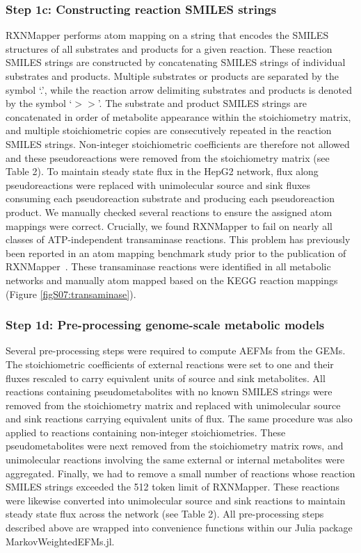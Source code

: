 \documentclass[12pt]{article}
\begin{document}
\subsubsection*{Step 1c: Constructing reaction SMILES strings}

RXNMapper performs atom mapping on a string that encodes the SMILES
structures of all substrates and products for a given reaction. These
reaction SMILES strings are constructed by concatenating SMILES strings of
individual substrates and products. Multiple substrates or products are
separated by the symbol `.', while the reaction arrow delimiting
substrates and products is denoted by the symbol `$>>$'. The substrate and
product SMILES strings are concatenated in order of metabolite appearance
within the stoichiometry matrix, and multiple stoichiometric copies are
consecutively repeated in the reaction SMILES strings. Non-integer
stoichiometric coefficients are therefore not allowed and these
pseudoreactions were removed from the stoichiometry matrix (see Table 2).
To maintain steady state flux in the HepG2 network, flux along
pseudoreactions were replaced with unimolecular source and sink fluxes
consuming each pseudoreaction substrate and producing each pseudoreaction
product. We manually checked several reactions to ensure the assigned atom
mappings were correct. Crucially, we found RXNMapper to fail on nearly all
classes of ATP-independent transaminase reactions. This problem has
previously been reported in an atom mapping benchmark study prior to the
publication of RXNMapper~\citep{PreciatGonzalezGermanA.2017Ceoa}. These
transaminase reactions were identified in all metabolic networks and
manually atom mapped based on the KEGG reaction mappings (Figure
\ref{figS07:transaminase}).

\subsubsection*{Step 1d: Pre-processing genome-scale metabolic models}

Several pre-processing steps were required to compute AEFMs from the GEMs.
The stoichiometric coefficients of external reactions were set to one and
their fluxes rescaled to carry equivalent units of source and sink
metabolites. All reactions containing pseudometabolites with no known
SMILES strings were removed from the stoichiometry matrix and replaced
with unimolecular source and sink reactions carrying equivalent units of
flux. The same procedure was also applied to reactions containing
non-integer stoichiometries. These pseudometabolites were next removed
from the stoichiometry matrix rows, and unimolecular reactions involving
the same external or internal metabolites were aggregated. Finally, we had
to remove a small number of reactions whose reaction SMILES strings
exceeded the 512 token limit of RXNMapper. These reactions were likewise
converted into unimolecular source and sink reactions to maintain steady
state flux across the network (see Table 2). All pre-processing steps
described above are wrapped into convenience functions within our Julia
package MarkovWeightedEFMs.jl.
\end{document}
